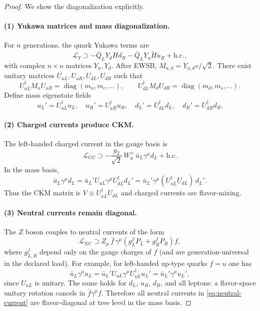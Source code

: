 \documentclass[11pt]{article}
\theoremstyle{remark}
\newcommand{\CC}{\ensuremath{\mathrm{CC}}}
\newcommand{\NC}{\ensuremath{\mathrm{NC}}}
\DeclareMathOperator{\diag}{diag}
\begin{document}
\begin{proof}
We show the diagonalization explicitly.

\paragraph{(1) Yukawa matrices and mass diagonalization.}
For $n$ generations, the quark Yukawa terms are
\begin{equation}
\mathcal{L}_Y\supset -\bar Q_L Y_d H d_R - \bar Q_L Y_u \tilde H u_R + \mathrm{h.c.},
\end{equation}
with complex $n\times n$ matrices $Y_u,Y_d$. After EWSB, $M_{u,d}=Y_{u,d}v/\sqrt2$.
There exist unitary matrices $U_{uL},U_{uR},U_{dL},U_{dR}$ such that
\begin{equation}
U_{uL}^\dagger M_u U_{uR}=\diag(m_u,m_c,\dots),\qquad
U_{dL}^\dagger M_d U_{dR}=\diag(m_d,m_s,\dots).
\end{equation}
Define mass eigenstate fields
\begin{equation}
u_L'=U_{uL}^\dagger u_L,\quad u_R'=U_{uR}^\dagger u_R,\quad
d_L'=U_{dL}^\dagger d_L,\quad d_R'=U_{dR}^\dagger d_R.
\end{equation}

\paragraph{(2) Charged currents produce CKM.}
The left-handed charged current in the gauge basis is
\begin{equation}
\mathcal{L}_{\CC}\supset -\frac{g_2}{\sqrt2}\,W^+_\mu\,\bar u_L\gamma^\mu d_L + \mathrm{h.c.}
\end{equation}
In the mass basis,
\begin{equation}
\bar u_L\gamma^\mu d_L
=
\bar u_L' U_{uL}\gamma^\mu U_{dL}^\dagger d_L'
=
\bar u_L'\gamma^\mu (U_{uL}^\dagger U_{dL})\,d_L'.
\end{equation}
Thus the CKM matrix is $V\equiv U_{uL}^\dagger U_{dL}$ and charged currents are flavor-mixing.

\paragraph{(3) Neutral currents remain diagonal.}
The $Z$ boson couples to neutral currents of the form
\begin{equation}\label{eq:neutral-current}
\mathcal{L}_{\NC}\supset Z_\mu\,\bar f\,\gamma^\mu\left(g_L^f P_L+g_R^f P_R\right)f,
\end{equation}
where $g_{L,R}^f$ depend only on the gauge charges of $f$ (and are generation-universal in the declared load).
For example, for left-handed up-type quarks $f=u$ one has
\begin{equation}
\bar u_L\gamma^\mu u_L = \bar u_L' U_{uL}\gamma^\mu U_{uL}^\dagger u_L' = \bar u_L'\gamma^\mu u_L',
\end{equation}
since $U_{uL}$ is unitary. The same holds for $d_L$, $u_R$, $d_R$, and all leptons: a flavor-space unitary
rotation cancels in $\bar f \gamma^\mu f$. Therefore all neutral currents in \eqref{eq:neutral-current} are
flavor-diagonal at tree level in the mass basis.


\end{proof}
\end{document}
